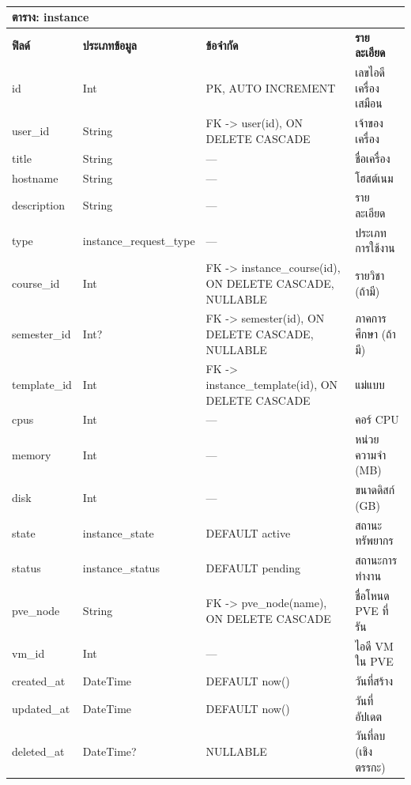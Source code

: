 \begin{table}[htbp]
    \caption{}\label{tab3:instance_fields}
    \centering
    \renewcommand{\arraystretch}{1.2}
    \small
    \begin{tabular}{p{} p{} p{} p{}}
        \hline
        \multicolumn{4}{l}{\textbf{ตาราง: instance}} \\
        \hline
            \textbf{ฟิลด์} & \textbf{ประเภทข้อมูล} & \textbf{ข้อจำกัด} & \textbf{รายละเอียด} \\
        \hline
        id & Int & PK, AUTO INCREMENT & เลขไอดีเครื่องเสมือน \\
        user\_id & String & FK -> user(id), ON DELETE CASCADE & เจ้าของเครื่อง \\
        title & String & — & ชื่อเครื่อง \\
        hostname & String & — & โฮสต์เนม \\
        description & String & — & รายละเอียด \\
        type & instance\_request\_type & — & ประเภทการใช้งาน \\
        course\_id & Int & FK -> instance\_course(id), ON DELETE CASCADE, NULLABLE & รายวิชา (ถ้ามี) \\
        semester\_id & Int? & FK -> semester(id), ON DELETE CASCADE, NULLABLE & ภาคการศึกษา (ถ้ามี) \\
        template\_id & Int & FK -> instance\_template(id), ON DELETE CASCADE & แม่แบบ \\
        cpus & Int & — & คอร์ CPU \\
        memory & Int & — & หน่วยความจำ (MB) \\
        disk & Int & — & ขนาดดิสก์ (GB) \\
        state & instance\_state & DEFAULT active & สถานะทรัพยากร \\
        status & instance\_status & DEFAULT pending & สถานะการทำงาน \\
        pve\_node & String & FK -> pve\_node(name), ON DELETE CASCADE & ชื่อโหนด PVE ที่รัน \\
        vm\_id & Int & — & ไอดี VM ใน PVE \\
        created\_at & DateTime & DEFAULT now() & วันที่สร้าง \\
        updated\_at & DateTime & DEFAULT now() & วันที่อัปเดต \\
        deleted\_at & DateTime? & NULLABLE & วันที่ลบ (เชิงตรรกะ) \\
        \hline
    \end{tabular}
\end{table}

